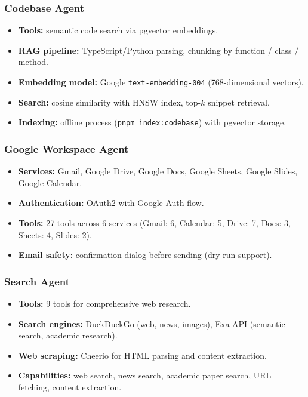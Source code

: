 \documentclass[11pt,a4paper]{report}
\newcommand{\code}[1]{\texttt{\small #1}}
\begin{document}
\subsubsection{Codebase Agent}
\begin{itemize}
  \item \textbf{Tools:} semantic code search via pgvector embeddings.
  \item \textbf{RAG pipeline:} TypeScript/Python parsing, chunking by function / class / method.
  \item \textbf{Embedding model:} Google \code{text-embedding-004} (768-dimensional vectors).
  \item \textbf{Search:} cosine similarity with HNSW index, top-$k$ snippet retrieval.
  \item \textbf{Indexing:} offline process (\code{pnpm index:codebase}) with pgvector storage.
\end{itemize}

\subsubsection{Google Workspace Agent}
\begin{itemize}
  \item \textbf{Services:} Gmail, Google Drive, Google Docs, Google Sheets, Google Slides, Google Calendar.
  \item \textbf{Authentication:} OAuth2 with Google Auth flow.
  \item \textbf{Tools:} 27 tools across 6 services (Gmail: 6, Calendar: 5, Drive: 7, Docs: 3, Sheets: 4, Slides: 2).
  \item \textbf{Email safety:} confirmation dialog before sending (dry-run support).
\end{itemize}

\subsubsection{Search Agent}
\begin{itemize}
  \item \textbf{Tools:} 9 tools for comprehensive web research.
  \item \textbf{Search engines:} DuckDuckGo (web, news, images), Exa API (semantic search, academic research).
  \item \textbf{Web scraping:} Cheerio for HTML parsing and content extraction.
  \item \textbf{Capabilities:} web search, news search, academic paper search, URL fetching, content extraction.
\end{itemize}
\end{document}
